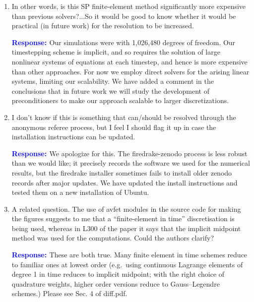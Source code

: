 \documentclass{article}
\theoremstyle{definition}
\newcommand{\rv}[1]{%
  \colorbox{gray!20}{%
    \parbox{0.96\linewidth}{%
      \small #1
    }%
  }%
}
\newcommand{\rp}{\textbf{\textcolor{blue}{Response: }}}
\begin{document}
\begin{enumerate}
\rp Fixed. Thank you so much for pointing this out. If we can choose $\bm A$ with a proper gauge $(\bm A, \bm B_H)=0$, then we can strengthen the inequality as the author pointed out. 

This is equivalent to saying that 
\begin{equation}
    |\Tilde{\mathcal{H}}|\leq C^{-1} \|\bm B_R\|^2
\end{equation}
since $\|\bm B\|^2 = \|\bm B_R\|^2 +\|\bm B_H\|^2$ due to $\bm B_R \perp \bm B_H$. Please see Remark 3.9 of diff.pdf.

\item \rv{In other words, is this SP
finite-element method significantly more expensive than previous solvers?...So it would be good to know whether it would be
practical (in future work) for the resolution to be increased.}

\rp Our simulations were with 1,026,480 degrees of freedom. Our timestepping scheme is implicit, and so requires the solution of large nonlinear systems of equations at each timestep, and hence is more expensive than other approaches. For now we employ direct solvers for the arising linear systems, limiting our scalability. We have added a comment in the conclusions that in future work we will study the development of preconditioners to make our approach scalable to larger discretizations.

\item \rv{I don’t know if this is
something that can/should be resolved through the anonymous referee process, but I feel
I should flag it up in case the installation instructions can be updated.} 

\rp We apologize for this. The firedrake-zenodo process is less robust than we would like; it precisely records the software we used for the numerical results, but the firedrake installer sometimes fails to install older zenodo records after major updates. We have updated the install instructions and tested them on a new installation of Ubuntu. 
\item \rv{A related question. The use of avfet modules in the source code for making the figures
suggests to me that a “finite-element in time” discretisation is being used, whereas in L300
of the paper it says that the implicit midpoint method was used for the computations.
Could the authors clarify?}

\rp These are both true. Many finite element in time schemes reduce to familiar ones at lowest order (e.g.~using continuous Lagrange elements of degree 1 in time reduces to implicit midpoint; with the right choice of quadrature weights, higher order versions reduce to Gauss--Legendre schemes.) Please see Sec. 4 of diff.pdf. 
\end{enumerate}
\end{document}
